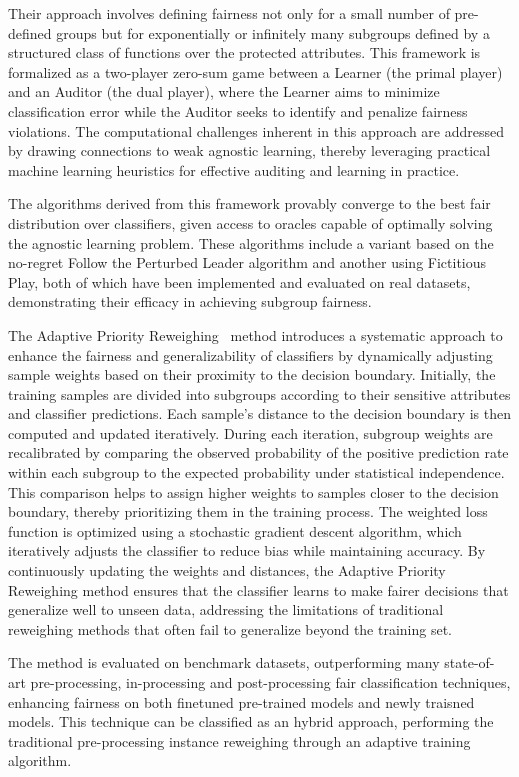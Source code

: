 Their approach involves defining fairness not only for a small number of pre-defined groups but for exponentially or infinitely many subgroups defined by a structured class of functions over the protected attributes. This framework is formalized as a two-player zero-sum game between a Learner (the primal player) and an Auditor (the dual player), where the Learner aims to minimize classification error while the Auditor seeks to identify and penalize fairness violations. The computational challenges inherent in this approach are addressed by drawing connections to weak agnostic learning, thereby leveraging practical machine learning heuristics for effective auditing and learning in practice.

The algorithms derived from this framework provably converge to the best fair distribution over classifiers, given access to oracles capable of optimally solving the agnostic learning problem. These algorithms include a variant based on the no-regret Follow the Perturbed Leader algorithm and another using Fictitious Play, both of which have been implemented and evaluated on real datasets, demonstrating their efficacy in achieving subgroup fairness.


The Adaptive Priority Reweighing~\cite{HuXT23} method introduces a systematic approach to enhance the fairness and generalizability of classifiers by dynamically adjusting sample weights based on their proximity to the decision boundary. Initially, the training samples are divided into subgroups according to their sensitive attributes and classifier predictions. Each sample's distance to the decision boundary is then computed and updated iteratively. During each iteration, subgroup weights are recalibrated by comparing the observed probability of the positive prediction rate within each subgroup to the expected probability under statistical independence. This comparison helps to assign higher weights to samples closer to the decision boundary, thereby prioritizing them in the training process. The weighted loss function is optimized using a stochastic gradient descent algorithm, which iteratively adjusts the classifier to reduce bias while maintaining accuracy. By continuously updating the weights and distances, the Adaptive Priority Reweighing method ensures that the classifier learns to make fairer decisions that generalize well to unseen data, addressing the limitations of traditional reweighing methods that often fail to generalize beyond the training set.

The method is evaluated on benchmark datasets, outperforming many state-of-art pre-processing, in-processing and post-processing fair classification techniques, enhancing fairness on both finetuned pre-trained models and newly traisned models. This technique can be classified as an hybrid approach, performing the traditional pre-processing instance reweighing through an adaptive training algorithm. 


